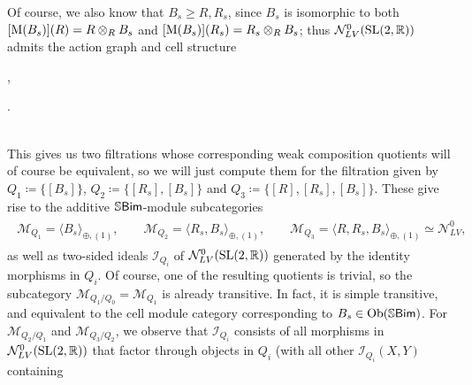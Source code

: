 \begin{example}
\noindent Of course, we also know that $B_{s} \geq R, R_{s}$, since $B_{s}$ is isomorphic to both $[\textup{M}(B_{s})](R) = R \otimes_R B_{s}$ and $[\textup{M}(B_{s})](R_{s}) = R_{s} \otimes_R B_{s}$; thus $\mathcal{N}_{LV}^0(\textup{SL}(2, \mathbb{R}))$ admits the action graph and cell structure\\[-2.1\linespacing]%
\begin{center}
\nhphantom{\quad\ \ },\qquad\qquad\qquad{}.
\end{center}
\noindent\\[-3.5\linespacing] This gives us two filtrations whose corresponding weak composition quotients will of course be equivalent, so we will just compute them for the filtration given by ${Q_1 \coloneqq \{[B_{s}]\}}$, ${Q_2 \coloneqq \{[R_{s}], [B_{s}]\}}$ and ${Q_3 \coloneqq \{[R], [R_{s}], [B_{s}]\}}$. These give rise to the additive $\mathbb{S}\textnormal{\textsf{Bim}}$-module subcategories
\begin{align*}
\begin{split}
\mathcal{M}_{Q_1} = \langle B_{s} \rangle_{\oplus,(1)},\qquad\mathcal{M}_{Q_2} = \langle R_{s}, B_{s}\rangle_{\oplus,(1)},\qquad\mathcal{M}_{Q_3} = \langle R, R_{s}, B_{s}\rangle_{\oplus,(1)} \simeq \mathcal{N}_{LV}^0,
\end{split}
\end{align*}
\noindent as well as two-sided ideals $\mathcal{I}_{Q_i}$ of $\mathcal{N}_{LV}^0(\textup{SL}(2, \mathbb{R}))$ generated by the identity morphisms in $Q_i$. Of course, one of the resulting quotients is trivial, so the subcategory $\mathcal{M}_{Q_1/Q_0} = \mathcal{M}_{Q_1}$ is already transitive. In fact, it is simple transitive, and equivalent to the cell module category corresponding to $B_s \in \textnormal{Ob}(\mathbb{S}\textnormal{\textsf{Bim}})$. For $\mathcal{M}_{Q_2/Q_1}$ and $\mathcal{M}_{Q_3/Q_2}$, we observe that $\mathcal{I}_{Q_i}$ consists of all morphisms in $\mathcal{N}_{LV}^0(\textup{SL}(2, \mathbb{R}))$ that factor through objects in $Q_i$ (with all other $\mathcal{I}_{Q_i}(X, Y)$ containing %

\end{example}
